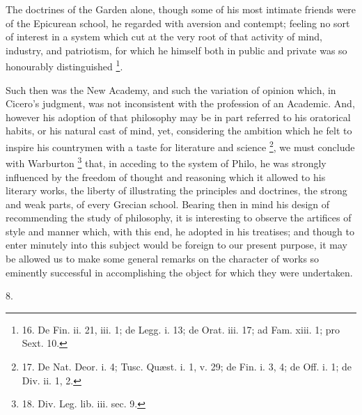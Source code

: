 The doctrines of the Garden
alone, though some of his most intimate friends were of the Epicurean
school, he regarded with aversion and contempt; feeling no sort of
interest in a system which cut at the very root of that activity of
mind, industry, and patriotism, for which he himself both in
public and private was so honourably distinguished \footnote{16. De Fin. ii. 21, iii. 1; de
Legg. i. 13; de Orat. iii. 17; ad Fam. xiii. 1; pro Sext. 10.}.

Such then was the New Academy,
and such the variation of opinion which, in Cicero's judgment, was
not inconsistent with the profession of an Academic. And, however his
adoption of that philosophy may be in part referred to his oratorical
habits, or his natural cast of mind, yet, considering the ambition
which he felt to inspire his countrymen with a taste for literature
and science \footnote{17. De Nat. Deor. i. 4; Tusc.
Quæst. i. 1, v. 29; de Fin. i. 3, 4; de Off. i. 1; de Div. ii. 1, 2.}, we must conclude with Warburton
\footnote{18. Div. Leg. lib. iii. sec.
9.} that,
in acceding to the system of Philo, he was strongly influenced by the
freedom of thought and reasoning which it allowed to his literary
works, the liberty of illustrating the principles and doctrines, the
strong and weak parts, of every Grecian school. Bearing then in mind
his design of recommending the study of philosophy, it is interesting
to observe the artifices of style and manner which, with this end, he
adopted in his treatises; and though to enter minutely into this
subject would be foreign to our present purpose, it may be allowed us
to make some general remarks on the character of works so eminently
successful in accomplishing the object for which they were undertaken.

8.

